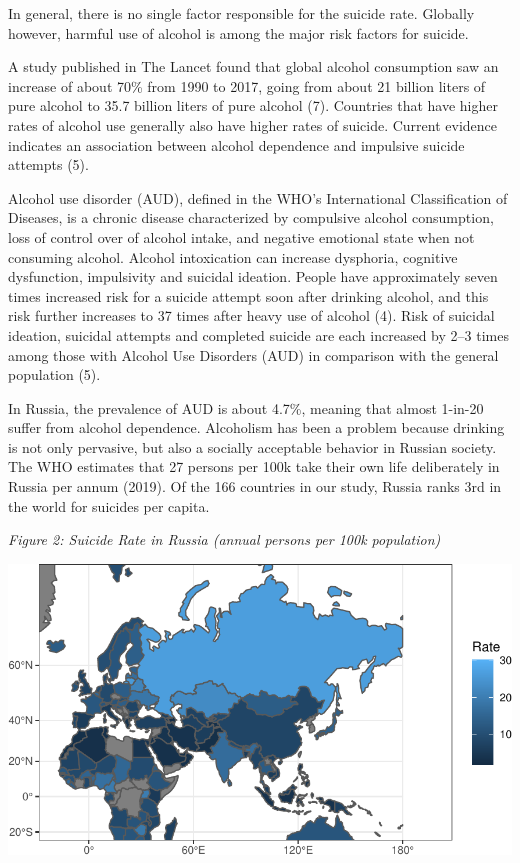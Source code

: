 \documentclass[]{article}
\begin{document}
In general, there is no single factor responsible for the suicide rate.
Globally however, harmful use of alcohol is among the major risk factors
for suicide.

A study published in The Lancet found that global alcohol consumption
saw an increase of about 70\% from 1990 to 2017, going from about 21
billion liters of pure alcohol to 35.7 billion liters of pure alcohol
(7). Countries that have higher rates of alcohol use generally also have
higher rates of suicide. Current evidence indicates an association
between alcohol dependence and impulsive suicide attempts (5).

Alcohol use disorder (AUD), defined in the WHO's International
Classification of Diseases, is a chronic disease characterized by
compulsive alcohol consumption, loss of control over of alcohol intake,
and negative emotional state when not consuming alcohol. Alcohol
intoxication can increase dysphoria, cognitive dysfunction, impulsivity
and suicidal ideation. People have approximately seven times increased
risk for a suicide attempt soon after drinking alcohol, and this risk
further increases to 37 times after heavy use of alcohol (4). Risk of
suicidal ideation, suicidal attempts and completed suicide are each
increased by 2--3 times among those with Alcohol Use Disorders (AUD) in
comparison with the general population (5).

In Russia, the prevalence of AUD is about 4.7\%, meaning that almost
1-in-20 suffer from alcohol dependence. Alcoholism has been a problem
because drinking is not only pervasive, but also a socially acceptable
behavior in Russian society. The WHO estimates that 27 persons per 100k
take their own life deliberately in Russia per annum (2019). Of the 166
countries in our study, Russia ranks 3rd in the world for suicides per
capita.

\emph{Figure 2: Suicide Rate in Russia (annual persons per 100k
population)}

\begin{center}\includegraphics{Project_Report_files/figure-latex/russia_map_plot-1} \end{center}
\end{document}

